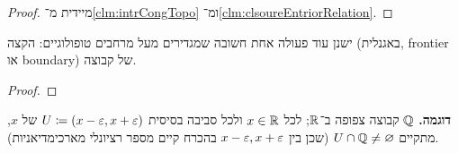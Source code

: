 \documentclass[name=רשימות טופולוגיה כללית]{../../../tex/classes/noChapterMegasumPreamble}
\begin{document}
	\begin{proof}
		מיידית מ־\ref{clm:intrCongTopo} ומ־\ref{clm:clsoureEntriorRelation}. 
	\end{proof}
	
	ישנן עוד פעולה אחת חשובה שמגדירים מעל מרחבים טופולוגיים: הקצה (באגנלית, frontier או boundary) של קבוצה. 
	\begin{proof}
	\end{proof}
	\textbf{דוגמה. }$\mathbb{Q}$ קבוצה צפופה ב־$\mathbb{R}$; לכל $x \in \mathbb{R}$ ולכל סביבה בסיסית $U \cod (x - \eg, x + \eg)$ של $x$, מתקיים $U \cap \mathbb{Q} \neq \varnothing$ (שכן בין $x - \eg, x + \eg$ בהכרח קיים מספר רציונלי מארכימדיאניות). 
\end{document}
